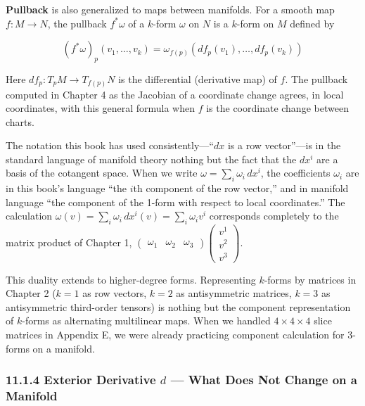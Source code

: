 \documentclass[a4paper,12pt,openany]{book}
\begin{document}
\textbf{Pullback} is also generalized to maps between manifolds. For a
smooth map \(f: M \to N\), the pullback \(f^*\omega\) of a \(k\)-form
\(\omega\) on \(N\) is a \(k\)-form on \(M\) defined by

\[(f^*\omega)_p(v_1, \dots, v_k) = \omega_{f(p)}(df_p(v_1), \dots, df_p(v_k))\]

Here \(df_p: T_p M \to T_{f(p)} N\) is the differential (derivative map)
of \(f\). The pullback computed in Chapter 4 as the Jacobian of a
coordinate change agrees, in local coordinates, with this general
formula when \(f\) is the coordinate change between charts.

The notation this book has used consistently—``\(dx\) is a row
vector''—is in the standard language of manifold theory nothing but
the fact that the \(dx^i\) are a basis of the cotangent space. When we
write \(\omega = \sum_i \omega_i\,dx^i\), the coefficients \(\omega_i\)
are in this book's language ``the \(i\)th component of the row vector,''
and in manifold language ``the component of the 1-form with respect to
local coordinates.'' The calculation
\(\omega(v) = \sum_i \omega_i\,dx^i(v) = \sum_i \omega_i v^i\)
corresponds completely to the matrix product of Chapter 1,
\(\begin{pmatrix}\omega_1&\omega_2&\omega_3\end{pmatrix}\begin{pmatrix}v^1\\v^2\\v^3\end{pmatrix}\).

This duality extends to higher-degree forms. Representing \(k\)-forms by
matrices in Chapter 2 (\(k=1\) as row vectors, \(k=2\) as antisymmetric
matrices, \(k=3\) as antisymmetric third-order tensors) is nothing but
the component representation of \(k\)-forms as alternating multilinear
maps. When we handled \(4\times4\times4\) slice matrices in Appendix E,
we were already practicing component calculation for 3-forms on a
manifold.

\hypertarget{exterior-derivative-d-what-does-not-change-on-a-manifold}{%
\subsubsection{\texorpdfstring{11.1.4 Exterior Derivative \(d\) — What
Does Not Change on a
Manifold}{11.1.4 Exterior Derivative d — What Does Not Change on a Manifold}}\label{exterior-derivative-d-what-does-not-change-on-a-manifold}}
\end{document}
